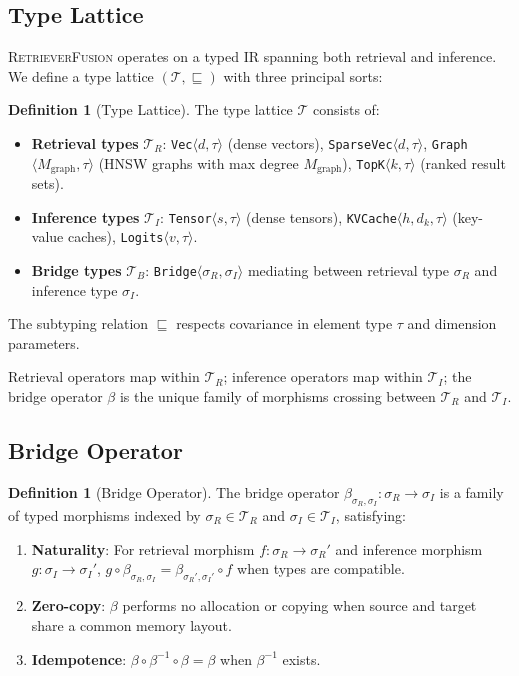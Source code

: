 \documentclass{article}
\theoremstyle{definition}
\newtheorem{definition}[theorem]{Definition}
\theoremstyle{remark}
\newcommand{\Mgraph}{M_{\mathrm{graph}}}
\newcommand{\RetrieverFusion}{\textsc{RetrieverFusion}}
\begin{document}
\subsection{Type Lattice}

\RetrieverFusion{} operates on a typed IR spanning both retrieval and inference.
We define a type lattice $(\mathcal{T}, \sqsubseteq)$ with three principal sorts:

\begin{definition}[Type Lattice]\label{def:type-lattice}
The type lattice $\mathcal{T}$ consists of:
\begin{itemize}[nosep]
  \item \textbf{Retrieval types} $\mathcal{T}_R$: \texttt{Vec}$\langle d, \tau\rangle$ (dense vectors), \texttt{SparseVec}$\langle d, \tau\rangle$, \texttt{Graph}$\langle \Mgraph, \tau\rangle$ (HNSW graphs with max degree $\Mgraph$), \texttt{TopK}$\langle k, \tau\rangle$ (ranked result sets).
  \item \textbf{Inference types} $\mathcal{T}_I$: \texttt{Tensor}$\langle s, \tau\rangle$ (dense tensors), \texttt{KVCache}$\langle h, d_k, \tau\rangle$ (key-value caches), \texttt{Logits}$\langle v, \tau\rangle$.
  \item \textbf{Bridge types} $\mathcal{T}_B$: \texttt{Bridge}$\langle \sigma_R, \sigma_I \rangle$ mediating between retrieval type $\sigma_R$ and inference type $\sigma_I$.
\end{itemize}
The subtyping relation $\sqsubseteq$ respects covariance in element type $\tau$ and dimension parameters.
\end{definition}

Retrieval operators map within $\mathcal{T}_R$; inference operators map within $\mathcal{T}_I$; the bridge operator $\beta$ is the unique family of morphisms crossing between $\mathcal{T}_R$ and $\mathcal{T}_I$.

\subsection{Bridge Operator}\label{sec:bridge}

\begin{definition}[Bridge Operator]\label{def:bridge}
The bridge operator $\beta_{\sigma_R, \sigma_I} : \sigma_R \to \sigma_I$ is a family of typed morphisms indexed by $\sigma_R \in \mathcal{T}_R$ and $\sigma_I \in \mathcal{T}_I$, satisfying:
\begin{enumerate}[nosep]
  \item \textbf{Naturality}: For retrieval morphism $f: \sigma_R \to \sigma_R'$ and inference morphism $g: \sigma_I \to \sigma_I'$, $g \circ \beta_{\sigma_R, \sigma_I} = \beta_{\sigma_R', \sigma_I'} \circ f$ when types are compatible.
  \item \textbf{Zero-copy}: $\beta$ performs no allocation or copying when source and target share a common memory layout.
  \item \textbf{Idempotence}: $\beta \circ \beta^{-1} \circ \beta = \beta$ when $\beta^{-1}$ exists.
\end{enumerate}
\end{definition}
\end{document}
